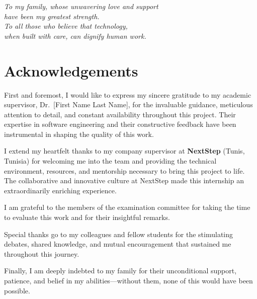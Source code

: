 \documentclass[12pt,a4paper,oneside,openany]{report}
\begin{document}
\clearpage

\thispagestyle{empty}
\vspace*{4cm}
\begin{flushright}
  \textit{To my family, whose unwavering love and support}\\[4pt]
  \textit{have been my greatest strength.}\\[14pt]
  \textit{To all those who believe that technology,}\\[4pt]
  \textit{when built with care, can dignify human work.}
\end{flushright}
\clearpage

\chapter*{Acknowledgements}

First and foremost, I would like to express my sincere gratitude to my academic supervisor, Dr.\ [First Name Last Name], for the invaluable guidance, meticulous attention to detail, and constant availability throughout this project. Their expertise in software engineering and their constructive feedback have been instrumental in shaping the quality of this work.

I extend my heartfelt thanks to my company supervisor at \textbf{NextStep} (Tunis, Tunisia) for welcoming me into the team and providing the technical environment, resources, and mentorship necessary to bring this project to life. The collaborative and innovative culture at NextStep made this internship an extraordinarily enriching experience.

I am grateful to the members of the examination committee for taking the time to evaluate this work and for their insightful remarks.

Special thanks go to my colleagues and fellow students for the stimulating debates, shared knowledge, and mutual encouragement that sustained me throughout this journey.

Finally, I am deeply indebted to my family for their unconditional support, patience, and belief in my abilities---without them, none of this would have been possible.
\clearpage
\end{document}
